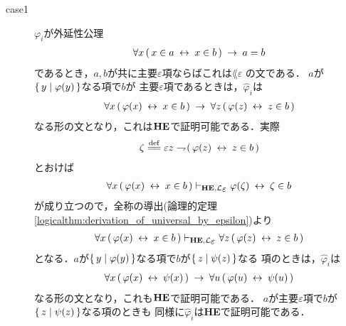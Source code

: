 \begin{metaprf}
\begin{description}
			\item[case1] $\varphi_{i}$が外延性公理
				\begin{align}
					\forall x\, (\, x \in a \hspace{0.25em}\leftrightarrow\hspace{0.25em} x \in b\, ) \hspace{0.25em}\rightarrow\hspace{0.25em} a = b
				\end{align}
				であるとき，$a,b$が共に主要$\varepsilon$項ならばこれは$\lang{\varepsilon}$
				の文である．
				$a$が$\{\, y \mid \varphi(y)\, \}$なる項で$b$が
				主要$\varepsilon$項であるときは，$\widehat{\varphi}_{i}$は
				\begin{align}
					\forall x\, (\, \varphi(x) \hspace{0.25em}\leftrightarrow\hspace{0.25em} x \in b\, ) \hspace{0.25em}\rightarrow\hspace{0.25em} 
					\forall z\, (\, \varphi(z) \hspace{0.25em}\leftrightarrow\hspace{0.25em} z \in b\, )
				\end{align}
				なる形の文となり，これは${\bf HE}$で証明可能である．実際
				\begin{align}
					\zeta \defeq \varepsilon z \negation (\, \varphi(z) \lrarrow z \in b\, )
				\end{align}
				とおけば
				\begin{align}
					\forall x\, (\, \varphi(x) \lrarrow x \in b\, ) 
					\provable{\mbox{{\bf HE}},\lang{\varepsilon}} \varphi(\zeta) \lrarrow \zeta \in b
				\end{align}
				が成り立つので，全称の導出(論理的定理\ref{logicalthm:derivation_of_universal_by_epsilon})より
				\begin{align}
					\forall x\, (\, \varphi(x) \lrarrow x \in b\, ) 
					\provable{\mbox{{\bf HE}},\lang{\varepsilon}}
					\forall z\, (\, \varphi(z) \lrarrow z \in b\, )
				\end{align}
				となる．$a$が$\{\, y \mid \varphi(y)\, \}$なる項で$b$が$\{\, z \mid \psi(z)\, \}$なる
				項のときは，$\widehat{\varphi}_{i}$は
				\begin{align}
					\forall x\, (\, \varphi(x) \hspace{0.25em}\leftrightarrow\hspace{0.25em} \psi(x)\, ) \hspace{0.25em}\rightarrow\hspace{0.25em} 
					\forall u\, (\, \varphi(u) \hspace{0.25em}\leftrightarrow\hspace{0.25em} \psi(u)\, )
				\end{align}
				なる形の文となり，これも${\bf HE}$で証明可能である．
				$a$が主要$\varepsilon$項で$b$が$\{\, z \mid \psi(z)\, \}$なる項のときも
				同様に$\widehat{\varphi}_{i}$は{\bf HE}で証明可能である．
			

\end{description}
\end{metaprf}

